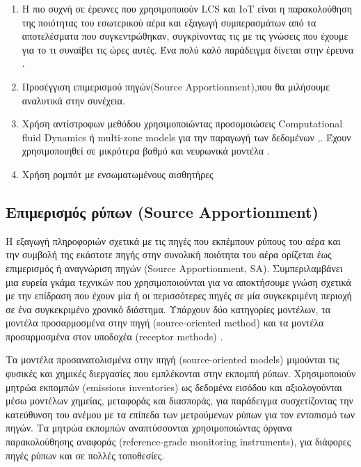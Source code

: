 \begin{enumerate}
\item  Η πιο συχνή σε έρευνες που χρησιμοποιούν LCS και IoT είναι η παρακολούθηση της ποιότητας του εσωτερικού αέρα και εξαγωγή συμπερασμάτων από τα αποτελέσματα που συγκεντρώθηκαν, συγκρίνοντας τις με τις γνώσεις που έχουμε για το τι συναίβει τις ώρες αυτές.
Ένα πολύ καλό παράδειγμα δίνεται στην έρευνα \cite{Becerra2020}.
\item Προσέγγιση επιμερισμού πηγών(Source Apportionment),που θα μιλήσουμε αναλυτικά στην συνέχεια.

\item Χρήση αντίστροφων μεθόδου χρησιμοποιώντας προσομοιώσεις Computational fluid Dynamics ή multi-zone models για την παραγωγή των δεδομένων \cite{Li2022},\cite{Liu2007}.
Έχουν χρησιμοποιηθεί σε μικρότερα βαθμό και νευρωνικά μοντέλα \cite{bastani2012}.
\item Χρήση ρομπότ με ενσωματωμένους αισθητήρες \cite{Xiao2025}

 \end {enumerate}   

\subsection{Επιμερισμός ρύπων (Source Apportionment)}

Η  εξαγωγή πληροφοριών σχετικά με τις πηγές που εκπέμπουν ρύπους του αέρα και την συμβολή της εκάστοτε πηγής στην συνολική ποιότητα του αέρα ορίζεται έως επιμερισμός ή αναγνώριση πηγών (Source Apportionment, SA).
Συμπεριλαμβάνει μια ευρεία γκάμα τεχνικών που χρησιμοποιούνται για να αποκτήσουμε γνώση σχετικά με την επίδραση που έχουν μία ή οι περισσότερες πηγές σε μία συγκεκριμένη περιοχή σε ένα συγκεκριμένο χρονικό διάστημα.
Υπάρχουν δύο κατηγορίες μοντέλων, τα μοντέλα προσαρμοσμένα στην πηγή (source-oriented  method) και τα μοντέλα προσαρμοσμένα στον υποδοχέα (receptor methods) \cite{SARAGA2023165744}.

Τα μοντέλα προσανατολισμένα στην πηγή (source-oriented models) μιμούνται τις φυσικές και χημικές διεργασίες που εμπλέκονται στην εκπομπή ρύπων. 
Χρησιμοποιούν μητρώα εκπομπών (emissions inventories) ως δεδομένα εισόδου και αξιολογούνται μέσω μοντέλων χημείας, μεταφοράς και διασποράς, για παράδειγμα συσχετίζοντας την κατεύθυνση του ανέμου με τα επίπεδα των μετρούμενων ρύπων για τον εντοπισμό των πηγών.
 Τα μητρώα εκπομπών αναπτύσσονται χρησιμοποιώντας όργανα παρακολούθησης αναφοράς (reference-grade monitoring instruments), για διάφορες πηγές ρύπων και σε πολλές τοποθεσίες.
 
